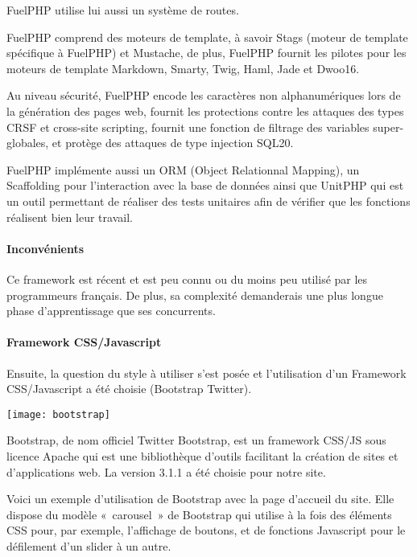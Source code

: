 FuelPHP utilise lui aussi un système de routes.

FuelPHP comprend des moteurs de template, à savoir Stags (moteur de template spécifique à FuelPHP) et Mustache, de plus, FuelPHP fournit les pilotes pour les moteurs de template Markdown, Smarty, Twig, Haml, Jade et Dwoo16.

Au niveau sécurité, FuelPHP encode les caractères non alphanumériques lors de la génération des pages web, fournit les protections contre les attaques des types CRSF et cross-site scripting, fournit une fonction de filtrage des variables super-globales, et protège des attaques de type injection SQL20.

FuelPHP implémente aussi un ORM (Object Relationnal Mapping), un Scaffolding pour l'interaction avec la base de données ainsi que UnitPHP qui est un outil permettant de réaliser des tests unitaires afin de vérifier que les fonctions réalisent bien leur travail.

\paragraph{Inconvénients}
Ce framework est récent et est peu connu ou du moins peu utilisé par les programmeurs français.
De plus, sa complexité demanderais une plus longue phase d'apprentissage que ses concurrents.

\paragraph{Framework CSS/Javascript}
Ensuite, la question du style à utiliser s'est posée et l'utilisation d'un Framework CSS/Javascript a été choisie (Bootstrap Twitter).

\begin{center}\texttt{[image: bootstrap]}\end{center}

Bootstrap, de nom officiel Twitter Bootstrap, est un framework CSS/JS sous licence Apache qui est une bibliothèque d'outils facilitant la création de sites et d'applications web. La version 3.1.1 a été choisie pour notre site.

Voici un exemple d'utilisation de Bootstrap avec la page d'accueil du site. Elle dispose du modèle «~carousel~» de Bootstrap qui utilise à la fois des éléments CSS pour, par exemple, l'affichage de boutons, et de fonctions Javascript pour le défilement d'un slider à un autre.

